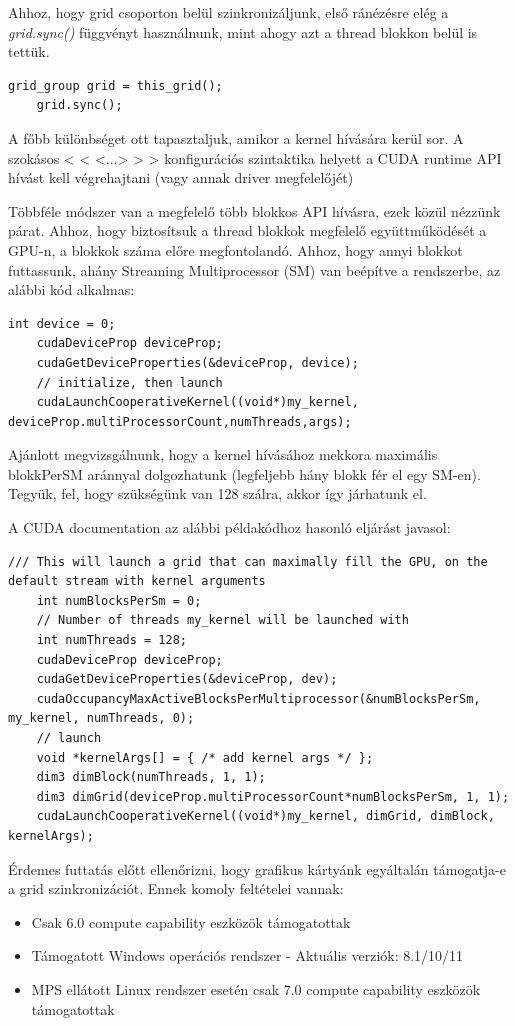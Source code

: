 Ahhoz, hogy grid csoporton belül szinkronizáljunk, első ránézésre elég a \textit{grid.sync()} függvényt használnunk, mint ahogy azt a thread blokkon belül is tettük.

\begin{lstlisting}[style=CStyle]
	grid_group grid = this_grid();
	grid.sync();
\end{lstlisting}

A főbb különbséget ott tapasztaljuk, amikor a kernel hívására kerül sor. A szokásos < < <...> > > konfigurációs szintaktika helyett a CUDA runtime API hívást kell végrehajtani (vagy annak driver megfelelőjét) \cite{CooperativeLaunchkernel}

Többféle módszer van a megfelelő több blokkos API hívásra, ezek közül nézzünk párat.
Ahhoz, hogy biztosítsuk a thread blokkok megfelelő együttműködését a GPU-n, a blokkok száma előre megfontolandó. Ahhoz, hogy annyi blokkot futtassunk, ahány Streaming Multiprocessor (SM) van beépítve a rendszerbe, az alábbi kód alkalmas:
\begin{lstlisting}[style=CStyle]
	int device = 0;
	cudaDeviceProp deviceProp;
	cudaGetDeviceProperties(&deviceProp, device);
	// initialize, then launch
	cudaLaunchCooperativeKernel((void*)my_kernel, deviceProp.multiProcessorCount,numThreads,args);
\end{lstlisting}

Ajánlott megvizsgálnunk, hogy a kernel hívásához mekkora maximális blokkPerSM aránnyal dolgozhatunk (legfeljebb hány blokk fér el egy SM-en). Tegyük, fel, hogy szükségünk van 128 szálra, akkor így járhatunk el. 

A CUDA documentation az alábbi példakódhoz hasonló eljárást javasol:

\begin{lstlisting}[style=CStyle]
	/// This will launch a grid that can maximally fill the GPU, on the default stream with kernel arguments
	int numBlocksPerSm = 0;
	// Number of threads my_kernel will be launched with
	int numThreads = 128;
	cudaDeviceProp deviceProp;
	cudaGetDeviceProperties(&deviceProp, dev);
	cudaOccupancyMaxActiveBlocksPerMultiprocessor(&numBlocksPerSm, my_kernel, numThreads, 0);
	// launch
	void *kernelArgs[] = { /* add kernel args */ };
	dim3 dimBlock(numThreads, 1, 1);
	dim3 dimGrid(deviceProp.multiProcessorCount*numBlocksPerSm, 1, 1);
	cudaLaunchCooperativeKernel((void*)my_kernel, dimGrid, dimBlock, kernelArgs);
\end{lstlisting}

Érdemes futtatás előtt ellenőrizni, hogy grafikus kártyánk egyáltalán támogatja-e a grid szinkronizációt. Ennek komoly feltételei vannak:
\begin{itemize}
	\item Csak 6.0 compute capability eszközök támogatottak
	\item Támogatott Windows operációs rendszer - Aktuális verziók: 8.1/10/11 \cite{supportedWinOS} 
	\item MPS ellátott Linux rendszer esetén csak 7.0 compute capability eszközök támogatottak
\end{itemize}


